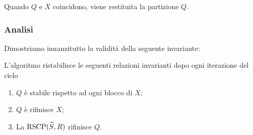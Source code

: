 Quando $Q$ e $X$ coincidono, viene restituita la partizione $Q$.

\subsubsection{Analisi}
Dimostriamo innanzitutto la validità della seguente invariante:
\begin{lemma}
    \label{lem:pt_qx}
    L'algoritmo ristabilisce le seguenti relazioni invarianti dopo ogni iterazione del ciclo
    \begin{enumerate}
        \item $Q$ è stabile rispetto ad ogni blocco di $X$;
        \item $Q$ è rifinisce $X$;
        \item La $\textup{RSCP}(\widetilde{S},R)$ rifinisce $Q$.
    \end{enumerate}
\end{lemma}
